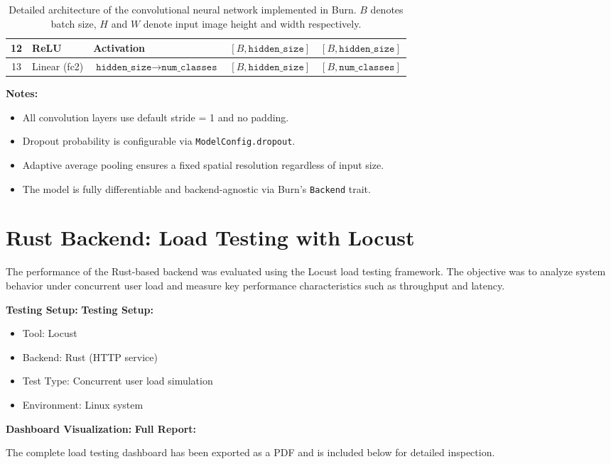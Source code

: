 \documentclass[11pt,a4paper]{article}
\begin{document}
\begin{table}[h!]
\begin{tabular}{|c|l|l|l|l|}
\hline
12 & ReLU &
Activation &
$[B, \texttt{hidden\_size}]$ &
$[B, \texttt{hidden\_size}]$ \\

\hline
13 & Linear (fc2) &
$\texttt{hidden\_size} \rightarrow \texttt{num\_classes}$ &
$[B, \texttt{hidden\_size}]$ &
$[B, \texttt{num\_classes}]$ \\

\hline
\end{tabular}
\caption{Detailed architecture of the convolutional neural network implemented in Burn. 
$B$ denotes batch size, $H$ and $W$ denote input image height and width respectively.}
\label{tab:burn-cnn-architecture}
\end{table}

\noindent\textbf{Notes:}
\begin{itemize}
  \item All convolution layers use default stride = 1 and no padding.
  \item Dropout probability is configurable via \texttt{ModelConfig.dropout}.
  \item Adaptive average pooling ensures a fixed spatial resolution regardless of input size.
  \item The model is fully differentiable and backend-agnostic via Burn's \texttt{Backend} trait.
\end{itemize}


\section{Rust Backend: Load Testing with Locust}

The performance of the Rust-based backend was evaluated using the Locust load testing framework. The objective was to analyze system behavior under concurrent user load and measure key performance characteristics such as throughput and latency.

\textbf{Testing Setup:}
\textbf{Testing Setup:}
\begin{itemize}
    \item Tool: Locust
    \item Backend: Rust (HTTP service)
    \item Test Type: Concurrent user load simulation
    \item Environment: Linux system
\end{itemize}

\textbf{Dashboard Visualization:}
\textbf{Full Report:}

The complete load testing dashboard has been exported as a PDF and is included below for detailed inspection.
\end{document}
